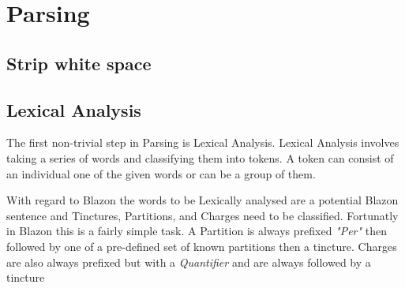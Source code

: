 \chapter{Parsing}



\section{Strip white space}

\section{Lexical Analysis} 

The first non-trivial step in Parsing is Lexical Analysis.  Lexical Analysis involves taking a series of words and classifying them into tokens.  A token can consist of an individual one of the given words or can be a group of them.  

With regard to Blazon the words to be Lexically analysed are a potential Blazon sentence and Tinctures, Partitions, and Charges need to be classified.  Fortunatly in Blazon this is a fairly simple task.  A Partition is always prefixed \emph{"Per"} then followed by one of a pre-defined set of known partitions then a tincture.  Charges are also always prefixed but with a \emph{Quantifier} and are always followed by a tincture 